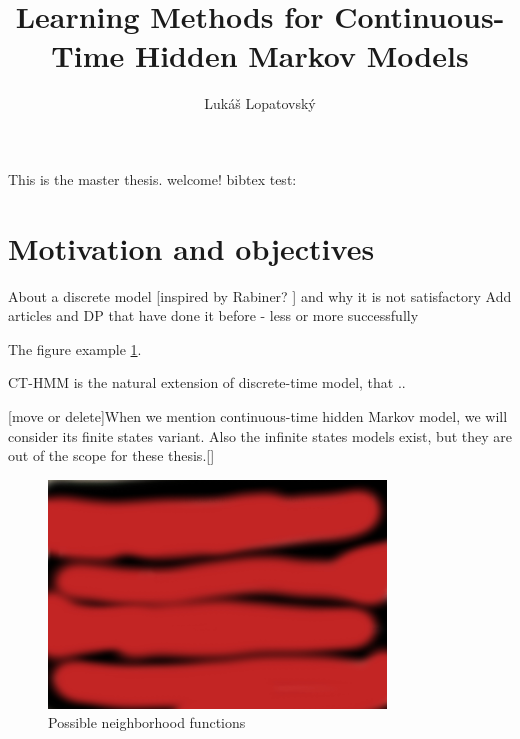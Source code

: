\documentclass[thesis=M,english]{FITthesis}[2012/10/20]
\title{Learning Methods for Continuous-Time Hidden Markov Models}
\author{Luk{\' a}{\v s} Lopatovsk{\' y}} %
\begin{document}


\begin{introduction}
	This is the master thesis. welcome!
	bibtex test: \cite{Sk01}
	\section{Motivation and objectives}
	About a discrete model [inspired by Rabiner? ] and why it is not satisfactory  %
	Add articles and DP that have done it before - less or more successfully 
	
The figure example \ref{fig:gb}.

CT-HMM is the natural extension of discrete-time model, that ..

[move or delete]When we mention continuous-time hidden Markov model, we will consider its finite states variant. Also the infinite states models exist, but they are out of the scope for these thesis.[]


\begin{figure}[h]
\centering
\includegraphics[width=0.8\textwidth]{img/ps.jpg}
\caption{Possible neighborhood functions \cite{Ho03} }
\label{fig:gb}
\end{figure} 	
	
	
\end{introduction}
\end{document}
